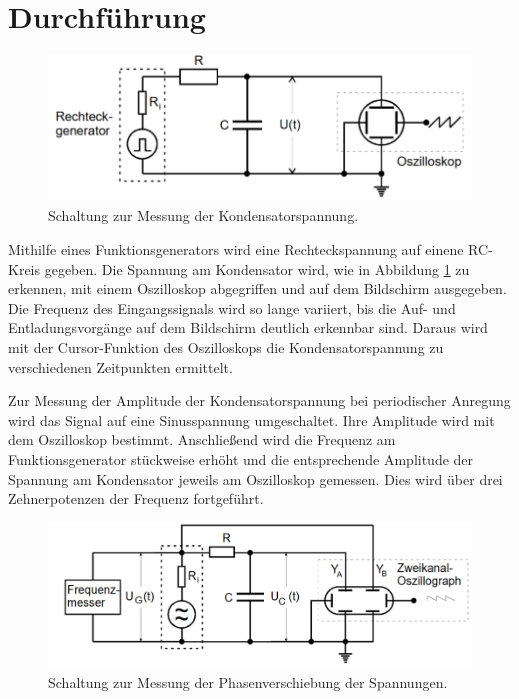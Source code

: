 \section{Durchführung}
\label{sec:Durchführung}

\begin{figure}[H]
  \centering
  \includegraphics[width=14cm]{Schaltung1.PNG}
  \caption{Schaltung zur Messung der Kondensatorspannung. \cite{sample}}
  \label{fig:Schaltung1}
\end{figure}

Mithilfe eines Funktionsgenerators wird eine Rechteckspannung auf einene RC-Kreis
gegeben. Die Spannung am Kondensator wird, wie in Abbildung \ref{fig:Schaltung1}
zu erkennen, mit einem Oszilloskop abgegriffen und
auf dem Bildschirm ausgegeben. Die Frequenz des Eingangssignals wird so lange variiert,
bis die Auf- und Entladungsvorgänge auf dem Bildschirm deutlich erkennbar sind.
Daraus wird mit der Cursor-Funktion des Oszilloskops die Kondensatorspannung zu verschiedenen Zeitpunkten ermittelt.

Zur Messung der Amplitude der Kondensatorspannung bei periodischer Anregung
wird das Signal auf eine Sinusspannung umgeschaltet. Ihre Amplitude wird mit dem Oszilloskop bestimmt.
Anschließend wird die Frequenz am Funktionsgenerator stückweise erhöht und die entsprechende Amplitude
der Spannung am Kondensator jeweils am Oszilloskop gemessen. Dies wird über drei Zehnerpotenzen der Frequenz
fortgeführt.

\begin{figure}[H]
  \centering
  \includegraphics[width=14cm]{Schaltung2.PNG}
  \caption{Schaltung zur Messung der Phasenverschiebung der Spannungen. \cite{sample}}
  \label{fig:Schaltung2}
\end{figure}


